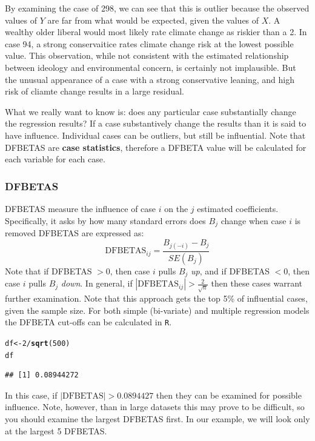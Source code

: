 \documentclass[11pt,openany]{book}\usepackage[]{graphicx}\usepackage[]{color}
\makeatletter
\newcommand{\hlnum}[1]{\textcolor[rgb]{0.686,0.059,0.569}{#1}}%
\newcommand{\hlopt}[1]{\textcolor[rgb]{0,0,0}{#1}}%
\newcommand{\hlstd}[1]{\textcolor[rgb]{0.345,0.345,0.345}{#1}}%
\newcommand{\hlkwb}[1]{\textcolor[rgb]{0.69,0.353,0.396}{#1}}%
\newcommand{\hlkwd}[1]{\textcolor[rgb]{0.737,0.353,0.396}{\textbf{#1}}}%
\newenvironment{kframe}{%
 \def\at@end@of@kframe{}%
 \ifinner\ifhmode%
  \def\at@end@of@kframe{\end{minipage}}%
  \begin{minipage}{\columnwidth}%
 \fi\fi%
 \def\FrameCommand##1{\hskip\@totalleftmargin \hskip-\fboxsep
 \colorbox{shadecolor}{##1}\hskip-\fboxsep
     \hskip-\linewidth \hskip-\@totalleftmargin \hskip\columnwidth}%
 \MakeFramed {\advance\hsize-\width
   \@totalleftmargin\z@ \linewidth\hsize
   \@setminipage}}%
 {\par\unskip\endMakeFramed%
 \at@end@of@kframe}
\newenvironment{knitrout}{}{} %
\renewenvironment{knitrout}{\begin{singlespace}}{\end{singlespace}}
\makeatother
\begin{document}
By examining the case of 298, we can see that this is outlier because the observed values of $Y$ are far from what would be expected, given the values of $X$. A wealthy older liberal would most likely rate climate change as riskier than a 2. In case 94, a strong conservaitice rates climate change risk at the lowest possible value.  This observation, while not consistent with the estimated relationship between ideology and environmental concern, is certainly not implausible.  But the unusual appearance of a case with a strong conservative leaning, and high risk of cliamte change results in a large residual.

What we really want to know is: does any particular case substantially change the regression results? If a case  substantively change the results than it is said to have influence. Individual cases can be outliers, but still be influential.  Note that DFBETAS are \textbf{case statistics}, therefore a DFBETA value will be calculated for each variable for each case.   

\subsubsection{DFBETAS} 
DFBETAS measure the influence of case $i$ on the $j$ estimated coefficients. Specifically, it asks by how many standard errors does $B_j$ change when case $i$ is removed DFBETAS are expressed as:
\begin{equation}
  \label{eq:dfbeta}
  \text{DFBETAS}_{ij} = \frac{B_{j(-i)}-B_j}{SE(B_j)}
\end{equation}
Note that if DFBETAS $ > 0$, then case $i$ pulls $B_j$ \textit{up}, and  if DFBETAS $ < 0$, then case $i$ pulls $B_j$ \textit{down}.  In general, if $|\text{DFBETAS}_{ij}| > \frac{2}{\sqrt{n}}$ then these cases warrant further examination. Note that this approach gets the top 5\% of influential cases, given the sample size. For both simple (bi-variate) and  multiple regression models the DFBETA cut-offs can be calculated in \texttt{R}.  
\begin{knitrout}
\color{fgcolor}\begin{kframe}
\begin{alltt}
\hlstd{df} \hlkwb{<-} \hlnum{2}\hlopt{/}\hlkwd{sqrt}\hlstd{(}\hlnum{500}\hlstd{)}
\hlstd{df}
\end{alltt}
\begin{verbatim}
## [1] 0.08944272
\end{verbatim}
\end{kframe}
\end{knitrout}
\noindent In this case, if $|\text{DFBETAS}| > 0.0894427$ then they can be examined for  possible influence. Note, however, than in large datasets this may prove to be difficult,  so you should examine the largest DFBETAS first. In our example, we will look only at the largest 5 DFBETAS.
\end{document}
